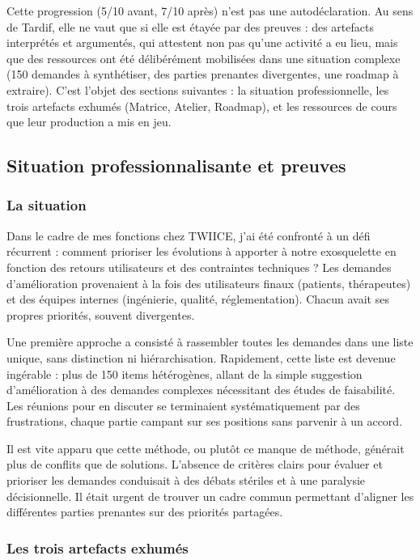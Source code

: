 Cette progression (5/10 avant, 7/10 après) n'est pas une autodéclaration. Au sens de Tardif, elle ne vaut que si elle est étayée par des preuves : des artefacts interprétés et argumentés, qui attestent non pas qu'une activité a eu lieu, mais que des ressources ont été délibérément mobilisées dans une situation complexe (150 demandes à synthétiser, des parties prenantes divergentes, une roadmap à extraire). C'est l'objet des sections suivantes : la situation professionnelle, les trois artefacts exhumés (Matrice, Atelier, Roadmap), et les ressources de cours que leur production a mis en jeu.

\subsection{Situation professionnalisante et preuves}

\subsubsection*{La situation}

Dans le cadre de mes fonctions chez TWIICE, j'ai été confronté à un défi récurrent : comment prioriser les évolutions à apporter à notre exosquelette en fonction des retours utilisateurs et des contraintes techniques ? Les demandes d'amélioration provenaient à la fois des utilisateurs finaux (patients, thérapeutes) et des équipes internes (ingénierie, qualité, réglementation). Chacun avait ses propres priorités, souvent divergentes.

Une première approche a consisté à rassembler toutes les demandes dans une liste unique, sans distinction ni hiérarchisation. Rapidement, cette liste est devenue ingérable : plus de 150 items hétérogènes, allant de la simple suggestion d'amélioration à des demandes complexes nécessitant des études de faisabilité. Les réunions pour en discuter se terminaient systématiquement par des frustrations, chaque partie campant sur ses positions sans parvenir à un accord.

Il est vite apparu que cette méthode, ou plutôt ce manque de méthode, générait plus de conflits que de solutions. L'absence de critères clairs pour évaluer et prioriser les demandes conduisait à des débats stériles et à une paralysie décisionnelle. Il était urgent de trouver un cadre commun permettant d'aligner les différentes parties prenantes sur des priorités partagées.

\subsubsection*{Les trois artefacts exhumés}

